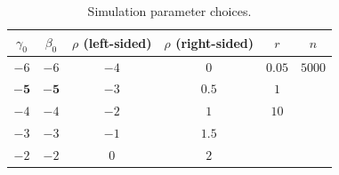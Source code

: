 \documentclass[12pt]{article}
\theoremstyle{definition}
\begin{document}
\begin{table}[!h]
  \centering
  \begin{tabular}{c|c|c|c|c|c}
  $\gamma_0$ & $\beta_0$ & $\rho$ (left-sided) & $\rho$ (right-sided) & $r$ & $n$ \\
  \hline
  $-6$ & $-6$ & $-4$ & $0$ & $0.05$ & $5000$ \\
  $\bm{-5}$ & $\bm{-5}$ & $-3$ & $0.5$ & $1$ & \\
  $-4$ & $-4$ & $-2$ & $1$ & $10$ & \\
  $-3$ & $-3$ & $-1$ & $1.5$ & & \\
  $-2$ & $-2$ & $0$ & $2$ & & \\
  \end{tabular}
\caption{Simulation parameter choices.}
\label{tab:simulation_parameter}
\end{table}
\end{document}
